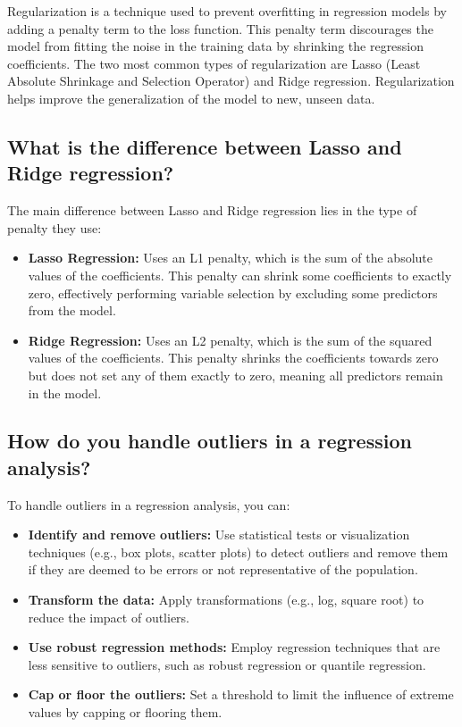 \documentclass[12pt]{article}
\begin{document}
Regularization is a technique used to prevent overfitting in regression models by adding a penalty term to the loss function. This penalty term discourages the model from fitting the noise in the training data by shrinking the regression coefficients. The two most common types of regularization are Lasso (Least Absolute Shrinkage and Selection Operator) and Ridge regression. Regularization helps improve the generalization of the model to new, unseen data.

\subsection{What is the difference between Lasso and Ridge regression?}

The main difference between Lasso and Ridge regression lies in the type of penalty they use:
\begin{itemize}
    \item \textbf{Lasso Regression:} Uses an L1 penalty, which is the sum of the absolute values of the coefficients. This penalty can shrink some coefficients to exactly zero, effectively performing variable selection by excluding some predictors from the model.
    \item \textbf{Ridge Regression:} Uses an L2 penalty, which is the sum of the squared values of the coefficients. This penalty shrinks the coefficients towards zero but does not set any of them exactly to zero, meaning all predictors remain in the model.
\end{itemize}

\subsection{How do you handle outliers in a regression analysis?}

To handle outliers in a regression analysis, you can:
\begin{itemize}
    \item \textbf{Identify and remove outliers:} Use statistical tests or visualization techniques (e.g., box plots, scatter plots) to detect outliers and remove them if they are deemed to be errors or not representative of the population.
    \item \textbf{Transform the data:} Apply transformations (e.g., log, square root) to reduce the impact of outliers.
    \item \textbf{Use robust regression methods:} Employ regression techniques that are less sensitive to outliers, such as robust regression or quantile regression.
    \item \textbf{Cap or floor the outliers:} Set a threshold to limit the influence of extreme values by capping or flooring them.
\end{itemize}
\end{document}
